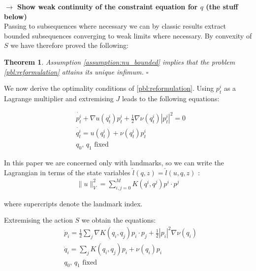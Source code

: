 \documentclass{article}
\newtheorem{theorem}{Theorem}
\newcommand{\half}{\frac 12}
\newcommand{\norm}[2]{\| #1 \|_{ #2 }}
\newcommand{\vnorm}[1]{\norm{ #1 }{V}}
\newcommand{\RdM}{\mathbb{R}^{d\times M}}
\begin{document}
\textbf{$\longrightarrow$ Show weak continuity of the constraint equation for
$q$ (the stuff below)}\\

Passing to subsequences where necessary we can by classic results
\cite{younes2010shapes} extract bounded subsequences converging to weak limits
where necessary. By convexity of $S$ we have therefore proved the following:

\begin{theorem}
Assumption \ref{assumption:nu_bounded} implies that the problem
\eqref{pbl:reformulation} attains its unique infimum.
{\hfill $\square$}
\end{theorem}

We now derive the optimality conditions of \eqref{pbl:reformulation}.
Using $p_t^i$ as a Lagrange multiplier and extremising $J$ leads to the
following equations:

\begin{subequations}\label{pbm:nonlinear_inner:optimality}
\begin{align}
& \dot{p_t^i} + \nabla u(q_t^i) p_t^i + \half \nabla \nu(q_t^i) |p_t^i|^2 = 0\\
& \dot{q_t^i} = u(q_t^i) + \nu(q_t^i) p^i_t\\
& q_0,\,q_1\text{ fixed}
\end{align}
\end{subequations}

In this paper we are concerned only with
landmarks, so we can write the Lagrangian in terms of the state variables $\hat
l(q, z) = \hat l(u, q, z)$ \cite{younes2010shapes}:
\begin{align*}
\vnorm{u}^2 = \sum_{i,j=0}^M K(q^i,q^j) p^i \cdot p^j
\end{align*}

where supercripts denote the landmark index. 

Extremising the action $S$ we obtain the equations: 
\begin{align}\label{pq:optimality}
& \dot p_i =\frac12 \sum_j \nabla K(q_i,q_j)p_i\cdot p_j  + \frac12 |p_i|^2 \nabla \nu(q_i)\\
& \dot q_i = \sum_j K(q_i,q_j)p_i + \nu(q_i)p_i\\
& q_0,\,q_1\text{ fixed}
\end{align}
\end{document}
